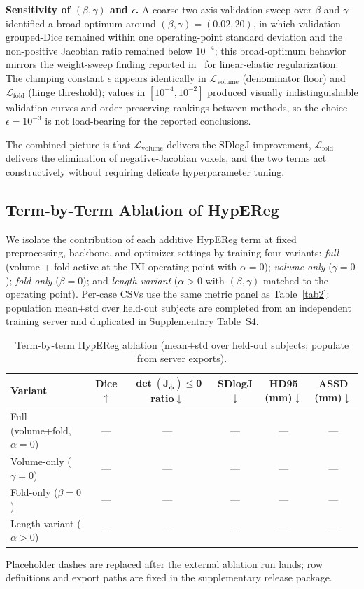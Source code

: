\documentclass[jimaging,article,submit,pdftex,moreauthors]{Definitions/mdpi}
\begin{document}
\noindent\textbf{Sensitivity of $(\beta,\gamma)$ and $\epsilon$.} A coarse two-axis validation sweep over $\beta$ and $\gamma$ identified a broad optimum around $(\beta,\gamma)=(0.02,20)$, in which validation grouped-Dice remained within one operating-point standard deviation and the non-positive Jacobian ratio remained below $10^{-4}$; this broad-optimum behavior mirrors the weight-sweep finding reported in~\cite{elasticmorph2025} for linear-elastic regularization. The clamping constant $\epsilon$ appears identically in $\mathcal{L}_{\mathrm{volume}}$ (denominator floor) and $\mathcal{L}_{\mathrm{fold}}$ (hinge threshold); values in $[10^{-4},10^{-2}]$ produced visually indistinguishable validation curves and order-preserving rankings between methods, so the choice $\epsilon=10^{-3}$ is not load-bearing for the reported conclusions.

The combined picture is that $\mathcal{L}_{\mathrm{volume}}$ delivers the SDlogJ improvement, $\mathcal{L}_{\mathrm{fold}}$ delivers the elimination of negative-Jacobian voxels, and the two terms act constructively without requiring delicate hyperparameter tuning.

\subsection{Term-by-Term Ablation of HypEReg}\label{sec:ablation_terms}
We isolate the contribution of each additive HypEReg term at fixed preprocessing, backbone, and optimizer settings by training four variants: \emph{full} (volume + fold active at the IXI operating point with $\alpha=0$); \emph{volume-only} ($\gamma=0$); \emph{fold-only} ($\beta=0$); and \emph{length variant} ($\alpha>0$ with $(\beta,\gamma)$ matched to the operating point). Per-case CSVs use the same metric panel as Table~\ref{tab2}; population mean$\pm$std over held-out subjects are completed from an independent training server and duplicated in Supplementary Table~S4.

\begin{table}[H]
\caption{Term-by-term HypEReg ablation (mean$\pm$std over held-out subjects; populate from server exports).\label{tab:ablation_terms}}
\centering
\scriptsize
\setlength{\tabcolsep}{3pt}
\begin{tabularx}{\textwidth}{lccccc}
\toprule
\textbf{Variant} & \textbf{Dice$\uparrow$} & $\boldsymbol{\det(J_\phi)\le 0}$ \textbf{ratio$\downarrow$} & \textbf{SDlogJ$\downarrow$} & \textbf{HD95 (mm)$\downarrow$} & \textbf{ASSD (mm)$\downarrow$}\\
\midrule
Full (volume+fold, $\alpha{=}0$) & --- & --- & --- & --- & --- \\
Volume-only ($\gamma{=}0$) & --- & --- & --- & --- & --- \\
Fold-only ($\beta{=}0$) & --- & --- & --- & --- & --- \\
Length variant ($\alpha{>}0$) & --- & --- & --- & --- & --- \\
\bottomrule
\end{tabularx}
\parbox{\textwidth}{\footnotesize Placeholder dashes are replaced after the external ablation run lands; row definitions and export paths are fixed in the supplementary release package.}
\end{table}
\end{document}
